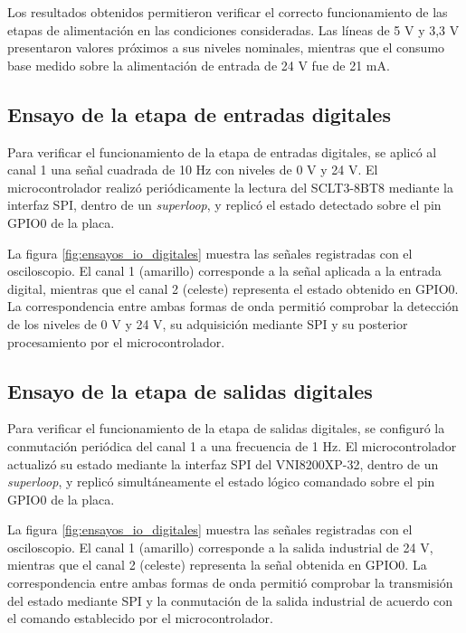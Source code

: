 Los resultados obtenidos permitieron verificar el correcto funcionamiento de las etapas de alimentación en las condiciones consideradas. Las líneas de 5 V y 3,3 V presentaron valores próximos a sus niveles nominales, mientras que el consumo base medido sobre la alimentación de entrada de 24 V fue de 21 mA.

\subsection{Ensayo de la etapa de entradas digitales}

Para verificar el funcionamiento de la etapa de entradas digitales, se aplicó al canal 1 una señal cuadrada de 10 Hz con niveles de 0 V y 24 V. El microcontrolador realizó periódicamente la lectura del SCLT3-8BT8 mediante la interfaz SPI, dentro de un \textit{superloop}, y replicó el estado detectado sobre el pin GPIO0 de la placa.

La figura \ref{fig:ensayos_io_digitales} muestra las señales registradas con el osciloscopio. El canal 1 (amarillo) corresponde a la señal aplicada a la entrada digital, mientras que el canal 2 (celeste) representa el estado obtenido en GPIO0. La correspondencia entre ambas formas de onda permitió comprobar la detección de los niveles de 0 V y 24 V, su adquisición mediante SPI y su posterior procesamiento por el microcontrolador.

\subsection{Ensayo de la etapa de salidas digitales}

Para verificar el funcionamiento de la etapa de salidas digitales, se configuró la conmutación periódica del canal 1 a una frecuencia de 1 Hz. El microcontrolador actualizó su estado mediante la interfaz SPI del VNI8200XP-32, dentro de un \textit{superloop}, y replicó simultáneamente el estado lógico comandado sobre el pin GPIO0 de la placa.

La figura \ref{fig:ensayos_io_digitales} muestra las señales registradas con el osciloscopio. El canal 1 (amarillo) corresponde a la salida industrial de 24 V, mientras que el canal 2 (celeste) representa la señal obtenida en GPIO0. La correspondencia entre ambas formas de onda permitió comprobar la transmisión del estado mediante SPI y la conmutación de la salida industrial de acuerdo con el comando establecido por el microcontrolador.

